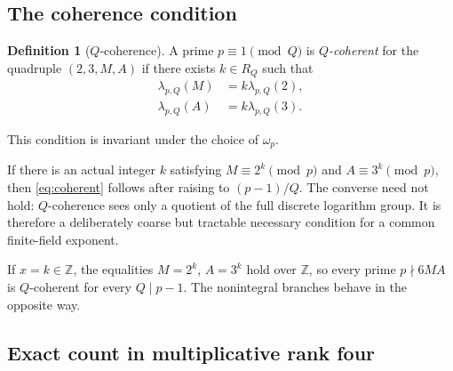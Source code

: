 \documentclass[11pt]{article}
\theoremstyle{definition}
\newtheorem{definition}[theorem]{Definition}
\theoremstyle{remark}
\newcommand{\Z}{\mathbb{Z}}
\begin{document}
\subsection{The coherence condition}

\begin{definition}[$Q$-coherence]\label{def:coherent}
A prime $p\equiv1\pmod Q$ is \emph{$Q$-coherent} for the quadruple $(2,3,M,A)$ if there
exists $k\in R_Q$ such that
\[
\begin{split}
  \lambda_{p,Q}(M)&=k\lambda_{p,Q}(2),\\
  \lambda_{p,Q}(A)&=k\lambda_{p,Q}(3).
\end{split}
\tag{4.2}\label{eq:coherent}
\]
\end{definition}
This condition is invariant under the choice of $\omega_p$.

If there is an actual integer $k$ satisfying
$M\equiv2^k\pmod p$ and $A\equiv3^k\pmod p$, then \eqref{eq:coherent} follows after raising
to $(p-1)/Q$.  The converse need not hold: $Q$-coherence sees only a quotient of the full
discrete logarithm group.  It is therefore a deliberately coarse but tractable necessary
condition for a common finite-field exponent.

If $x=k\in\Z$, the equalities $M=2^k$, $A=3^k$ hold over $\Z$, so every prime
$p\nmid6MA$ is $Q$-coherent for every $Q\mid p-1$.  The nonintegral branches behave in the
opposite way.

\subsection{Exact count in multiplicative rank four}
\end{document}
